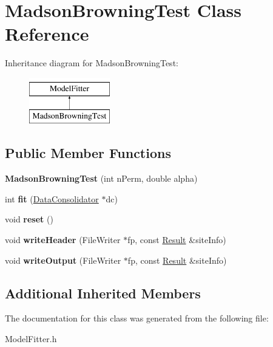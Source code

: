 \hypertarget{classMadsonBrowningTest}{\section{Madson\-Browning\-Test Class Reference}
\label{classMadsonBrowningTest}
}
Inheritance diagram for Madson\-Browning\-Test\-:\begin{figure}[H]
\begin{center}
\leavevmode
\includegraphics[height=2.000000cm]{classMadsonBrowningTest}
\end{center}
\end{figure}
\subsection*{Public Member Functions}
\begin{DoxyCompactItemize}
\item 
\hypertarget{classMadsonBrowningTest_a2f6a68960936fff6200a1b1eaf5791dd}{{\bfseries Madson\-Browning\-Test} (int n\-Perm, double alpha)}\label{classMadsonBrowningTest_a2f6a68960936fff6200a1b1eaf5791dd}

\item 
\hypertarget{classMadsonBrowningTest_a273b861db2af1cd83d8e1daf6084380b}{int {\bfseries fit} (\hyperlink{classDataConsolidator}{Data\-Consolidator} $\ast$dc)}\label{classMadsonBrowningTest_a273b861db2af1cd83d8e1daf6084380b}

\item 
\hypertarget{classMadsonBrowningTest_aab14718f5c6936b1e9887e871c914644}{void {\bfseries reset} ()}\label{classMadsonBrowningTest_aab14718f5c6936b1e9887e871c914644}

\item 
\hypertarget{classMadsonBrowningTest_a146e7e7454d9637c2102228da68903fa}{void {\bfseries write\-Header} (File\-Writer $\ast$fp, const \hyperlink{classResult}{Result} \&site\-Info)}\label{classMadsonBrowningTest_a146e7e7454d9637c2102228da68903fa}

\item 
\hypertarget{classMadsonBrowningTest_ac4d19c457d198fd30178c71af5a801f0}{void {\bfseries write\-Output} (File\-Writer $\ast$fp, const \hyperlink{classResult}{Result} \&site\-Info)}\label{classMadsonBrowningTest_ac4d19c457d198fd30178c71af5a801f0}

\end{DoxyCompactItemize}
\subsection*{Additional Inherited Members}


The documentation for this class was generated from the following file\-:\begin{DoxyCompactItemize}
\item 
Model\-Fitter.\-h\end{DoxyCompactItemize}
